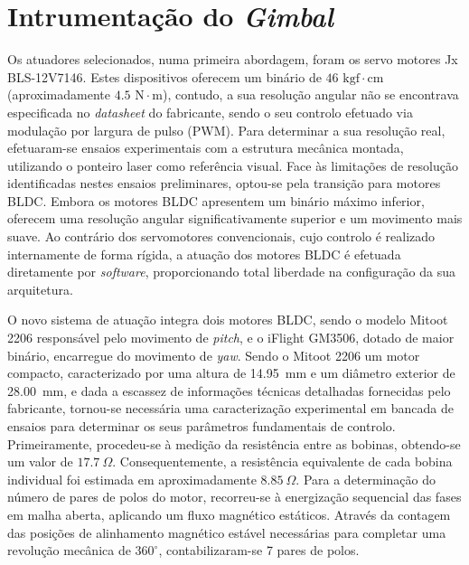 \section{Intrumentação do \emph{Gimbal}}

Os atuadores selecionados, numa primeira abordagem, foram os servo motores Jx BLS-12V7146. Estes dispositivos oferecem um binário de $46\text{ kgf}\cdot\text{cm}$ (aproximadamente $4.5\text{ N}\cdot\text{m}$), contudo, a sua resolução angular não se encontrava especificada no \emph{datasheet} do fabricante, sendo o seu controlo efetuado via modulação por largura de pulso (PWM). Para determinar a sua resolução real, efetuaram-se ensaios experimentais com a estrutura mecânica montada, utilizando o ponteiro laser como referência visual. Face às limitações de resolução identificadas nestes ensaios preliminares, optou-se pela transição para motores \ac{BLDC}. Embora os motores \ac{BLDC} apresentem um binário máximo inferior, oferecem uma resolução angular significativamente superior e um movimento mais suave. Ao contrário dos servomotores convencionais, cujo controlo é realizado internamente de forma rígida, a atuação dos motores \ac{BLDC} é efetuada diretamente por \emph{software}, proporcionando total liberdade na configuração da sua arquitetura.


O novo sistema de atuação integra dois motores \ac{BLDC}, sendo o modelo Mitoot 2206 responsável pelo movimento de \emph{pitch}, e o iFlight GM3506, dotado de maior binário, encarregue do movimento de \emph{yaw}. Sendo o Mitoot 2206 um motor compacto, caracterizado por uma altura de 14.95~mm e um diâmetro exterior de 28.00~mm, e dada a escassez de informações técnicas detalhadas fornecidas pelo fabricante, tornou-se necessária uma caracterização experimental em bancada de ensaios para determinar os seus parâmetros fundamentais de controlo. Primeiramente, procedeu-se à medição da resistência entre as bobinas, obtendo-se um valor de $17.7~\Omega$. Consequentemente, a resistência equivalente de cada bobina individual foi estimada em aproximadamente $8.85~\Omega$. Para a determinação do número de pares de polos do motor, recorreu-se à energização sequencial das fases em malha aberta, aplicando um fluxo magnético estáticos. Através da contagem das posições de alinhamento magnético estável necessárias para completar uma revolução mecânica de $360^\circ$, contabilizaram-se 7 pares de polos.


